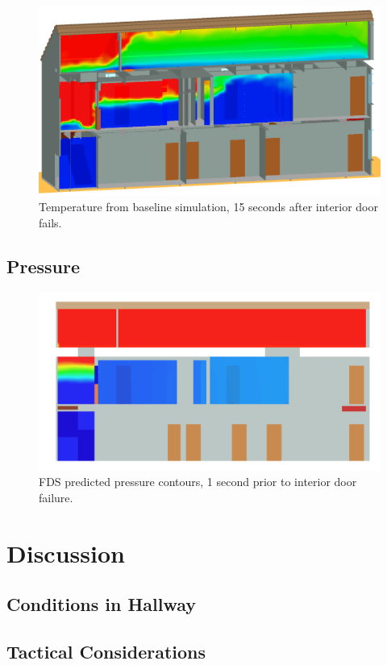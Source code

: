 \documentclass[11pt,oneside]{book}
\begin{document}
\begin{figure}[!ht]
\includegraphics[width=.675\textwidth]{../Figures/west_50th_baseline_175}
 

\caption{Temperature from baseline simulation, 15 seconds after interior door fails.}
\label{fig:temp_175s}
\end{figure}


\section{Pressure}

\begin{figure}[!ht]
\includegraphics[width=.75\textwidth]{../Figures/west_50th_baseline_pres}

\caption{FDS predicted pressure contours, 1 second prior to interior door failure.}
\label{fig:pres_159s}
\end{figure}


\chapter{Discussion}

\section{Conditions in Hallway}

\section{Tactical Considerations}
\end{document}
